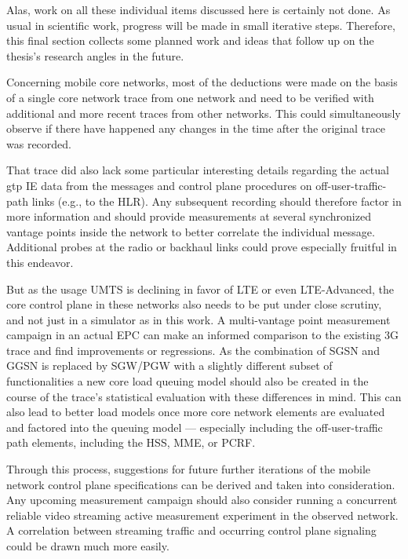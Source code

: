 Alas, work on all these individual items discussed here is certainly not done. As usual in scientific work, progress will be made in small iterative steps. Therefore, this final section collects some planned work and ideas that follow up on the thesis's research angles in the future.

Concerning mobile core networks, most of the deductions were made on the basis of a single core network trace from one network and need to be verified with additional and more recent traces from other networks. This could simultaneously observe if there have happened any changes in the time after the original trace was recorded.

That trace did also lack some particular interesting details regarding the actual \gls{gtp} \gls{IE} data from the messages and control plane procedures on off-user-traffic-path links (e.g., to the \gls{HLR}). Any subsequent recording should therefore factor in more information and should provide measurements at several synchronized vantage points inside the network to better correlate the individual message. Additional probes at the radio or backhaul links could prove especially fruitful in this endeavor. 

But as the usage \gls{UMTS} is declining in favor of \gls{LTE} or even \gls{LTE}-Advanced, the core control plane in these networks also needs to be put under close scrutiny, and not just in a simulator as in this work. A multi-vantage point measurement campaign in an actual \gls{EPC} can make an informed comparison to the existing \gls{3G} trace and find improvements or regressions. As the combination of \gls{SGSN} and \gls{GGSN} is replaced by \gls{SGW}/\gls{PGW} with a slightly different subset of functionalities a new core load queuing model should also be created in the course of the trace's statistical evaluation with these differences in mind. This can also lead to better load models once more core network elements are evaluated and factored into the queuing model --- especially including the off-user-traffic path elements, including the \gls{HSS}, \gls{MME}, or \gls{PCRF}.

Through this process, suggestions for future further iterations of the mobile network control plane specifications can be derived and taken into consideration. Any upcoming measurement campaign should also consider running a concurrent reliable video streaming active measurement experiment in the observed network. A correlation between streaming traffic and occurring control plane signaling could be drawn much more easily.


